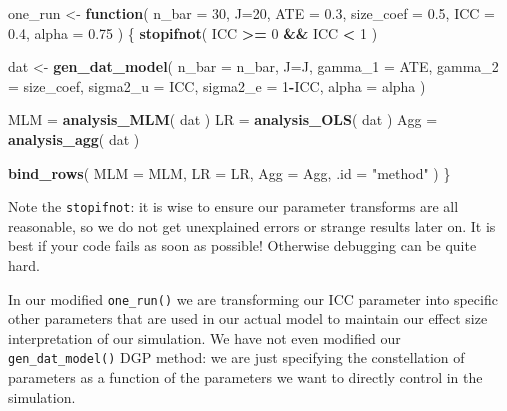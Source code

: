 \documentclass[
]{book}
\newenvironment{Shaded}{\begin{snugshade}}{\end{snugshade}}
\newcommand{\AttributeTok}[1]{\textcolor[rgb]{0.13,0.29,0.53}{#1}}
\newcommand{\ControlFlowTok}[1]{\textcolor[rgb]{0.13,0.29,0.53}{\textbf{#1}}}
\newcommand{\DecValTok}[1]{\textcolor[rgb]{0.00,0.00,0.81}{#1}}
\newcommand{\FloatTok}[1]{\textcolor[rgb]{0.00,0.00,0.81}{#1}}
\newcommand{\FunctionTok}[1]{\textcolor[rgb]{0.13,0.29,0.53}{\textbf{#1}}}
\newcommand{\NormalTok}[1]{#1}
\newcommand{\OtherTok}[1]{\textcolor[rgb]{0.56,0.35,0.01}{#1}}
\newcommand{\SpecialCharTok}[1]{\textcolor[rgb]{0.81,0.36,0.00}{\textbf{#1}}}
\newcommand{\StringTok}[1]{\textcolor[rgb]{0.31,0.60,0.02}{#1}}
\begin{document}
\begin{Shaded}
\begin{Highlighting}[]
\NormalTok{one\_run }\OtherTok{\textless{}{-}} \ControlFlowTok{function}\NormalTok{( }\AttributeTok{n\_bar =} \DecValTok{30}\NormalTok{, }\AttributeTok{J=}\DecValTok{20}\NormalTok{, }
                     \AttributeTok{ATE =} \FloatTok{0.3}\NormalTok{, }\AttributeTok{size\_coef =} \FloatTok{0.5}\NormalTok{,}
                     \AttributeTok{ICC =} \FloatTok{0.4}\NormalTok{,}
                     \AttributeTok{alpha =} \FloatTok{0.75}\NormalTok{ ) \{}
    \FunctionTok{stopifnot}\NormalTok{( ICC }\SpecialCharTok{\textgreater{}=} \DecValTok{0} \SpecialCharTok{\&\&}\NormalTok{ ICC }\SpecialCharTok{\textless{}} \DecValTok{1}\NormalTok{ )}

\NormalTok{  dat }\OtherTok{\textless{}{-}} \FunctionTok{gen\_dat\_model}\NormalTok{( }\AttributeTok{n\_bar =}\NormalTok{ n\_bar, }\AttributeTok{J=}\NormalTok{J, }
                        \AttributeTok{gamma\_1 =}\NormalTok{ ATE, }\AttributeTok{gamma\_2 =}\NormalTok{ size\_coef,}
                        \AttributeTok{sigma2\_u =}\NormalTok{ ICC, }\AttributeTok{sigma2\_e =} \DecValTok{1}\SpecialCharTok{{-}}\NormalTok{ICC,}
                        \AttributeTok{alpha =}\NormalTok{ alpha )}
  
\NormalTok{  MLM }\OtherTok{=} \FunctionTok{analysis\_MLM}\NormalTok{( dat )}
\NormalTok{  LR }\OtherTok{=} \FunctionTok{analysis\_OLS}\NormalTok{( dat )}
\NormalTok{  Agg }\OtherTok{=} \FunctionTok{analysis\_agg}\NormalTok{( dat )}
  
  \FunctionTok{bind\_rows}\NormalTok{( }\AttributeTok{MLM =}\NormalTok{ MLM, }\AttributeTok{LR =}\NormalTok{ LR, }\AttributeTok{Agg =}\NormalTok{ Agg,}
             \AttributeTok{.id =} \StringTok{"method"}\NormalTok{ )}
\NormalTok{\}}
\end{Highlighting}
\end{Shaded}

Note the \texttt{stopifnot}: it is wise to ensure our parameter transforms are all reasonable, so we do not get unexplained errors or strange results later on.
It is best if your code fails as soon as possible! Otherwise debugging can be quite hard.

In our modified \texttt{one\_run()} we are transforming our ICC parameter into specific other parameters that are used in our actual model to maintain our effect size interpretation of our simulation.
We have not even modified our \texttt{gen\_dat\_model()} DGP method: we are just specifying the constellation of parameters as a function of the parameters we want to directly control in the simulation.
\end{document}

